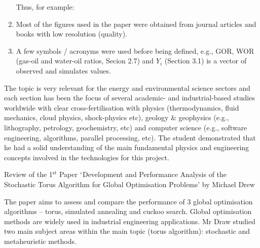 \documentclass[14pt,twoside]{report}
\begin{document}
\begin{enumerate}
\begin{enumerate}
\end{enumerate}  
Thus, for example:
%
\item Most of the figures used in the paper were obtained from journal articles and books with low resolution (quality).
%
\item A few symbols / acronyms were used before being defined, e.g., GOR, WOR (gas-oil and water-oil ratios, Secion 2.7) and $Y_{i}$ (Section 3.1) is a vector of observed and simulates values.
\end{enumerate}

The topic is very relevant for the energy and environmental science sectors and each section has been the focus of several academic- and industrial-based studies worldwide with clear cross-fertilisation with physics (thermodynamics, fluid mechanics, cloud physics, shock-physics etc), geology $\&$ geophysics (e.g., lithography, petrology, geochemistry, etc) and computer science (e.g., software engineering, algorithms, parallel processing, etc). The student demonstrated that he had a solid understanding of the main fundamental physics and engineering concepts involved in the technologies for this project.




\clearpage
{}

\bigskip

\begin{center}
  {\Large Review of the 1$^{\text{st}}$ Paper $\lq$Development and Performance Analysis of the Stochastic Torus Algorithm for Global Optimisation Problems' by Michael Drew}
\end{center}
The paper aims to assess and compare the performance of 3 global optimisation algorithms -- torus, simulated annealing and cuckoo search. Global optimisation methods are widely used in industrial engineering applications. Mr Draw studied two main subject areas within the main topic (torus algorithm): stochastic and metaheuristic methods.
\end{document}
